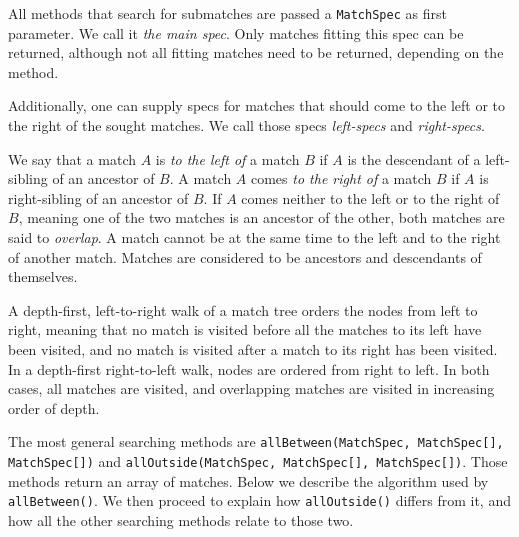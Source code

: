 All methods that search for submatches are passed a \texttt{MatchSpec} as first
parameter. We call it \emph{the main spec}. Only matches fitting this spec can
be returned, although not all fitting matches need to be returned, depending on
the method.

Additionally, one can supply specs for matches that should come to the left or
to the right of the sought matches. We call those specs \emph{left-specs} and
\emph{right-specs}.

We say that a match $A$ is \emph{to the left of} a match $B$ if $A$ is the
descendant of a left-sibling of an ancestor of $B$. A match $A$ comes \emph{to
  the right of} a match $B$ if $A$ is right-sibling of an ancestor of $B$. If
$A$ comes neither to the left or to the right of $B$, meaning one of the two
matches is an ancestor of the other, both matches are said to \emph{overlap}. A
match cannot be at the same time to the left and to the right of another
match. Matches are considered to be ancestors and descendants of themselves.

A depth-first, left-to-right walk of a match tree orders the nodes from left to
right, meaning that no match is visited before all the matches to its left have
been visited, and no match is visited after a match to its right has been
visited. In a depth-first right-to-left walk, nodes are ordered from right to
left. In both cases, all matches are visited, and overlapping matches are
visited in increasing order of depth.

The most general searching methods are \texttt{allBetween(MatchSpec,
  MatchSpec[], MatchSpec[])} and \texttt{allOutside(MatchSpec, MatchSpec[],
  MatchSpec[])}. Those methods return an array of matches. Below we describe the
algorithm used by \texttt{allBetween()}. We then proceed to explain how
\texttt{allOutside()} differs from it, and how all the other searching methods
relate to those two.

